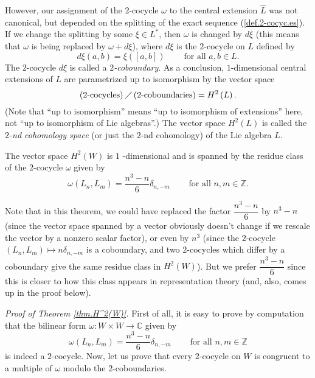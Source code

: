 \documentclass[etingof-lie.tex]{subfiles}
\begin{document}
\begin{definition}
However, our assignment of the $2$-cocycle $\omega$ to the central extension
$\widehat{L}$ was not canonical, but depended on the splitting of the exact
sequence (\ref{def.2-cocyc.es}). If we change the splitting by some $\xi\in
L^{\ast}$, then $\omega$ is changed by $d\xi$ (this means that $\omega$ is
being replaced by $\omega+d\xi$), where $d\xi$ is the $2$-cocycle on $L$
defined by
\[
d\xi\left(  a,b\right)  =\xi\left(  \left[  a,b\right]  \right)
\ \ \ \ \ \ \ \ \ \ \text{for all }a,b\in L.
\]
The $2$-cocycle $d\xi$ is called a $2$\textit{-coboundary}. As a conclusion,
$1$-dimensional central extensions of $L$ are parametrized up to isomorphism
by the vector space%
\[
\left(  2\text{-cocycles}\right)  \diagup\left(  2\text{-coboundaries}\right)
=H^{2}\left(  L\right)  .
\]
(Note that ``up to isomorphism'' means ``up to isomorphism of extensions''
here, not ``up to isomorphism of Lie algebras''.) The vector space
$H^{2}\left(  L\right)  $ is called the $2$\textit{-nd cohomology space} (or
just the $2$-nd cohomology) of the Lie algebra $L$.
\end{definition}

\begin{theorem}
\label{thm.H^2(W)}The vector space $H^{2}\left(  W\right)  $ is $1$%
-dimensional and is spanned by the residue class of the $2$-cocycle $\omega$
given by%
\[
\omega\left(  L_{n},L_{m}\right)  =\dfrac{n^{3}-n}{6}\delta_{n,-m}%
\ \ \ \ \ \ \ \ \ \ \text{for all }n,m\in\mathbb{Z}.
\]

\end{theorem}

Note that in this theorem, we could have replaced the factor $\dfrac{n^{3}%
-n}{6}$ by $n^{3}-n$ (since the vector space spanned by a vector obviously
doesn't change if we rescale the vector by a nonzero scalar factor), or even
by $n^{3}$ (since the $2$-cocycle $\left(  L_{n},L_{m}\right)  \mapsto
n\delta_{n,-m}$ is a coboundary, and two $2$-cocycles which differ by a
coboundary give the same residue class in $H^{2}\left(  W\right)  $). But we
prefer $\dfrac{n^{3}-n}{6}$ since this is closer to how this class appears in
representation theory (and, also, comes up in the proof below).

\textit{Proof of Theorem \ref{thm.H^2(W)}.} First of all, it is easy to prove
by computation that the bilinear form $\omega:W\times W\rightarrow\mathbb{C}$
given by%
\[
\omega\left(  L_{n},L_{m}\right)  =\dfrac{n^{3}-n}{6}\delta_{n,-m}%
\ \ \ \ \ \ \ \ \ \ \text{for all }n,m\in\mathbb{Z}%
\]
is indeed a $2$-cocycle. Now, let us prove that every $2$-cocycle on $W$ is
congruent to a multiple of $\omega$ modulo the $2$-coboundaries.
\end{document}
